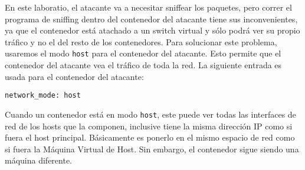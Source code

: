En este laboratio, el atacante va a necesitar sniffear los paquetes, pero correr el programa de sniffing dentro del contenedor del atacante tiene sus inconvenientes, ya que el contenedor está atachado a un switch virtual y sólo podrá ver su propio tráfico y no el del resto de los contenedores. Para solucionar este problema, usaremos el modo \texttt{host} para el contenedor del atacante. Esto permite que el contenedor del atacante vea el tráfico de toda la red. La siguiente entrada es usada para el contenedor del atacante:

\begin{lstlisting}
network_mode: host
\end{lstlisting}

Cuando un contenedor está en modo \texttt{host}, este puede ver todas las interfaces de red de los hosts que la componen, inclusive tiene la misma dirección IP como si fuera el host principal. Básicamente es ponerlo en el mismo espacio de red como si fuera la Máquina Virtual de Host. Sin embargo, el contenedor sigue siendo una máquina diferente.


